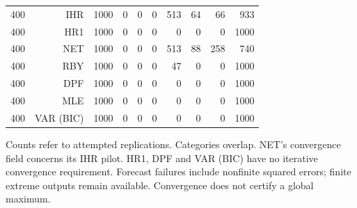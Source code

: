\begin{table}[p]
\begin{tabular}{rrrrrrrrrr}
400 & IHR & 1000 & 0 & 0 & 0 & 513 & 64 &  66 &  933 \\
400 & HR1 & 1000 & 0 & 0 & 0 &   0 &  0 &   0 & 1000 \\
400 & NET & 1000 & 0 & 0 & 0 & 513 & 88 & 258 &  740 \\
400 & RBY & 1000 & 0 & 0 & 0 &  47 &  0 &   0 & 1000 \\
400 & DPF & 1000 & 0 & 0 & 0 &   0 &  0 &   0 & 1000 \\
400 & MLE & 1000 & 0 & 0 & 0 &   0 &  0 &   0 & 1000 \\
400 & VAR (BIC) & 1000 & 0 & 0 & 0 &   0 &  0 &   0 & 1000 \\
\bottomrule\end{tabular}
\par\medskip
\begin{minipage}{0.98\linewidth}\footnotesize Counts refer to attempted replications. Categories overlap. NET's convergence field concerns its IHR pilot. HR1, DPF and VAR (BIC) have no iterative convergence requirement. Forecast failures include nonfinite squared errors; finite extreme outputs remain available. Convergence does not certify a global maximum.\end{minipage}
\end{table}
